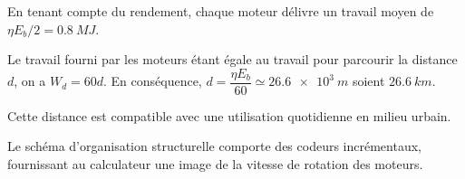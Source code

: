 \ifprof
\begin{corrige}

En tenant compte du rendement, chaque moteur délivre un travail moyen de $\eta E_b/2 = \SI{0,8}{MJ}$.

Le travail fourni par les moteurs étant égale au travail pour parcourir la distance $d$, on a $W_{d}=60d$. 
En conséquence, $d = \dfrac{\eta E_b}{60} \simeq \SI{26,6e3}{m}$ soient $\SI{26,6}{km}$.

Cette distance est compatible avec une utilisation quotidienne en milieu urbain.
\end{corrige}
\else
\fi
 
 \ifprof
 \else
Le schéma d’organisation structurelle comporte des codeurs incrémentaux, fournissant au calculateur une image de la vitesse de rotation des moteurs.
\fi

